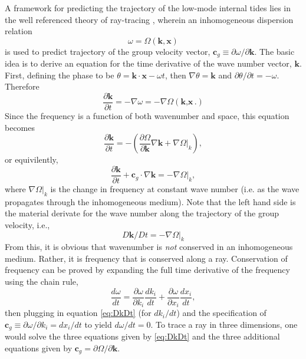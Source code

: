 \documentclass[12pt]{article}
\newcommand{\kv}{$\textbf{k}$}
\begin{document}
A framework for predicting the trajectory of the low-mode internal tides lies in the well referenced theory of ray-tracing \cite{Lighthill76}, wherein an inhomogeneous dispersion relation 
\begin{equation}
\label{eq:dispersion}
\omega = \Omega({\textbf{k},\textbf{x}})
\end{equation}
is used to predict trajectory of the group velocity vector, $\textbf{c}_g\equiv\partial\omega/\partial\textbf{k}$. The basic idea is to derive an equation for the time derivative of the wave number vector, \kv. First, defining the phase to be $\theta = \textbf{k}\cdot\textbf{x}-\omega t$, then $\nabla\theta = \textbf{k}$ and $\partial\theta/\partial t = -\omega$. Therefore
\begin{equation}
\frac{\partial\textbf{k}}{\partial t} = -\nabla\omega = -\nabla\Omega({\textbf{k},\textbf{x}}.)
\end{equation}
Since the frequency is a function of both wavenumber and space, this equation becomes
\begin{equation}
\frac{\partial\textbf{k}}{\partial t} = -\left(\frac{\partial\Omega}{\partial\textbf{k}}\nabla\textbf{k} + \nabla\Omega|_k  \right),
\end{equation}
or equivilently,
\begin{equation}
\frac{\partial\textbf{k}}{\partial t} + \textbf{c}_g\cdot\nabla\textbf{k} = -\nabla\Omega|_k,	
\end{equation}
where $\nabla\Omega|_k$ is the change in frequency at constant wave number (i.e. as the wave propagates through the inhomogeneous medium). Note that the left hand side is the material derivate for the wave number along the trajectory of the group velocity, i.e., 
\begin{equation}
\label{eq:DkDt}
D\textbf{k}/Dt = -\nabla\Omega|_k
\end{equation}
From this, it is obvious that wavenumber is \textit{not} conserved in an inhomogeneous medium. Rather, it is frequency that is conserved along a ray. Conservation of frequency can be proved by expanding the full time derivative of the frequency using the chain rule, 
\begin{equation}
\label{eq:DomegaDt}
\frac{d\omega}{dt} = \frac{\partial\omega}{\partial k_i}\frac{dk_i}{dt} + \frac{\partial\omega}{\partial x_i}\frac{dx_i}{dt},
\end{equation}
then plugging in equation \ref{eq:DkDt} (for $dk_i/dt$) and the specification of $\textbf{c}_g \equiv \partial\omega/\partial k_i = dx_i/dt$ to yield $d\omega/dt = 0$. To trace a ray in three dimensions, one would solve the three equations given by \ref{eq:DkDt} and the three additional equations given by $\textbf{c}_g = \partial\Omega/\partial\textbf{k}$.
\end{document}
